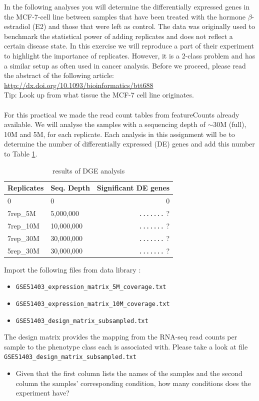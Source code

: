 In the following analyses you will determine the differentially expressed genes in the MCF-7-cell line between samples that have been treated with the hormone $\beta$-estradiol (E2) and those that were left as control.
The data was originally used to benchmark the statistical power of adding replicates and does not reflect a certain disease state.
In this exercise we will reproduce a part of their experiment to highlight the importance of replicates.
However, it is a 2-class problem and has a similar setup as often used in cancer analysis.
Before we proceed, please read the abstract of the following article:
\url{http://dx.doi.org/10.1093/bioinformatics/btt688}\\
Tip: Look up from what tissue the MCF-7 cell line originates.\\
\\
For this practical we made the read count tables from featureCounts already available.
We will analyse the samples with a sequencing depth of $\sim$30M (full), 10M and 5M, for each replicate.
Each analysis in this assignment will be to determine the number of differentially expressed (DE) genes and add this number to Table \ref{tab:dge_ad_01}.
\begin{table}[]
\centering
\caption{results of DGE analysis}
\label{tab:dge_ad_01}
\begin{tabular}{ | l | l | r | }
\hline
Replicates & Seq. Depth & Significant DE genes \\
\hline
0          & 0          & 0\quad\quad \\
7rep\_5M   & 5,000,000  & \verb|.......| ? \\
7rep\_10M  & 10,000,000 & \verb|.......| ? \\
7rep\_30M  & 30,000,000 & \verb|.......| ? \\
5rep\_30M  & 30,000,000 & \verb|.......| ? \\
\hline
\end{tabular}
\end{table}
Import the following files from data library \textit{\datalibrarydirrnaseqadvanced}:
\begin{itemize}
	\item[] \verb|GSE51403_expression_matrix_5M_coverage.txt|
	\item[] \verb|GSE51403_expression_matrix_10M_coverage.txt|
	\item[] \verb|GSE51403_design_matrix_subsampled.txt|
\end{itemize}
The design matrix provides the mapping from the RNA-seq read counts per sample to the phenotype class each is associated with.
Please take a look at file \verb|GSE51403_design_matrix_subsampled.txt|
\begin{itemize}
	\item Given that the first column lists the names of the samples and the second column the samples' corresponding condition, how many conditions does the experiment have?
\end{itemize}
